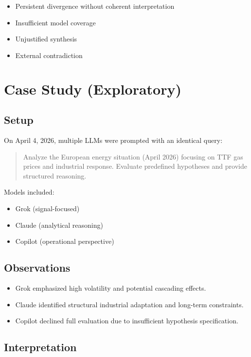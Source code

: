 \documentclass[11pt]{article}
\begin{document}
\begin{itemize}
\item Persistent divergence without coherent interpretation
\item Insufficient model coverage
\item Unjustified synthesis
\item External contradiction
\end{itemize}

\section{Case Study (Exploratory)}

\subsection{Setup}

On April 4, 2026, multiple LLMs were prompted with an identical query:

\begin{quote}
Analyze the European energy situation (April 2026) focusing on TTF gas prices and industrial response.
Evaluate predefined hypotheses and provide structured reasoning.
\end{quote}

Models included:
\begin{itemize}
\item Grok (signal-focused)
\item Claude (analytical reasoning)
\item Copilot (operational perspective)
\end{itemize}

\subsection{Observations}

\begin{itemize}
\item Grok emphasized high volatility and potential cascading effects.
\item Claude identified structural industrial adaptation and long-term constraints.
\item Copilot declined full evaluation due to insufficient hypothesis specification.
\end{itemize}

\subsection{Interpretation}
\end{document}
